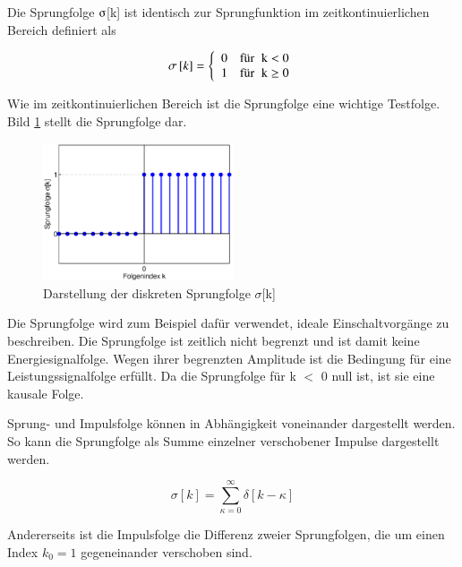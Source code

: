 \noindent Die Sprungfolge $\sigmaup$[k] ist identisch zur Sprungfunktion im zeitkontinuierlichen Bereich definiert als 

\begin{equation}\label{eq:threetwentytwo}
\sigma \left[k\right]=\left\{\begin{array}{l} {0\quad \text{für}\rm \;\; k<0} \\ {1\quad \text{für} \rm \;\; k\ge 0} \end{array}\right.
\end{equation}

\noindent Wie im zeitkontinuierlichen Bereich ist die Sprungfolge eine wichtige Testfolge. Bild \ref{fig:Sprungfolge} stellt die Sprungfolge dar.

\clearpage

\begin{figure}[H]
  \centerline{\includegraphics[width=0.5\textwidth]{Kapitel3/Bilder/image9.eps}}
  \caption{Darstellung der diskreten Sprungfolge $\sigma$[k]}
  \label{fig:Sprungfolge}
\end{figure}

\noindent Die Sprungfolge wird zum Beispiel daf\"{u}r verwendet, ideale Einschaltvorg\"{a}nge zu beschreiben. Die Sprungfolge ist zeitlich nicht begrenzt und ist damit keine Energiesignalfolge. Wegen ihrer begrenzten Amplitude ist die Bedingung f\"{u}r eine Leistungssignalfolge erf\"{u}llt. Da die Sprungfolge f\"{u}r k $\mathrm{<}$ 0 null ist, ist sie eine kausale Folge.

\noindent Sprung- und Impulsfolge k\"{o}nnen in Abh\"{a}ngigkeit voneinander dargestellt werden. So kann die Sprungfolge als Summe einzelner verschobener Impulse dargestellt werden.

\begin{equation}\label{eq:threetwentythree}
\sigma \left[k\right]=\sum _{\kappa =0}^{\infty }\delta \left[k-\kappa \right]
\end{equation}

\noindent Andererseits ist die Impulsfolge die Differenz zweier Sprungfolgen, die um einen Index $k{}_{0} = 1$ gegeneinander verschoben sind.


